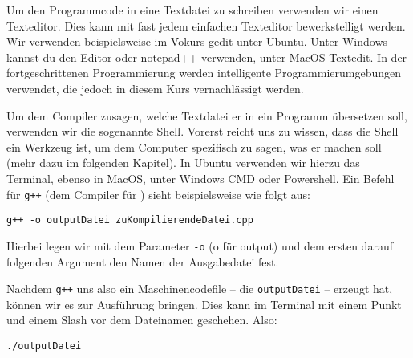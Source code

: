 Um den Programmcode in eine Textdatei zu schreiben verwenden wir einen Texteditor.
Dies kann mit fast jedem einfachen Texteditor bewerkstelligt werden. Wir verwenden beispielsweise im Vokurs gedit unter Ubuntu.
Unter Windows kannst du den Editor oder notepad++ verwenden, unter MacOS Textedit. 
In der fortgeschrittenen Programmierung werden intelligente Programmierumgebungen verwendet, die jedoch in diesem Kurs vernachlässigt werden.

Um dem Compiler zusagen, welche Textdatei er in ein Programm übersetzen soll, verwenden wir die sogenannte Shell. Vorerst reicht uns zu wissen, dass die Shell
ein Werkzeug ist, um dem Computer spezifisch zu sagen, was er machen soll (mehr dazu im folgenden Kapitel). In Ubuntu verwenden wir hierzu das Terminal, ebenso in MacOS,
unter Windows CMD oder Powershell. Ein Befehl für \texttt{g++} (dem Compiler für \Cpp) sieht beispielsweise wie folgt aus:

\begin{center}
    \texttt{g++ -o outputDatei zuKompilierendeDatei.cpp}
\end{center}
Hierbei legen wir mit dem Parameter \texttt{-o} (o für output) und dem ersten darauf folgenden Argument den Namen der Ausgabedatei fest.

Nachdem \texttt{g++} uns also ein Maschinencodefile -- die \texttt{outputDatei} --
erzeugt hat, können wir es zur Ausführung bringen. Dies kann im Terminal mit einem Punkt und einem Slash vor dem Dateinamen geschehen. Also:
\begin{center}
    \texttt{./outputDatei}
\end{center}



